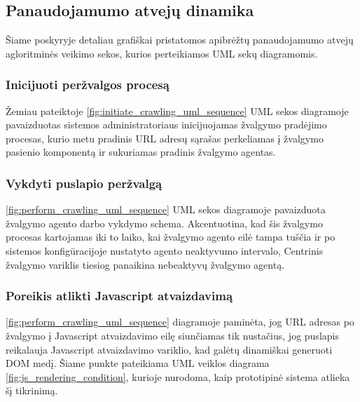 \pagebreak

\subsection{Panaudojamumo atvejų dinamika}

Šiame poskyryje detaliau grafiškai pristatomos apibrėžtų panaudojamumo atvejų agloritminės veikimo sekos, kurios perteikiamos UML sekų diagramomis. 

\subsubsection{Inicijuoti peržvalgos procesą}

Žemiau pateiktoje \ref{fig:initiate_crawling_uml_sequence} UML sekos diagramoje pavaizduotas sistemos administratoriaus inicijuojamas žvalgymo pradėjimo procesas, kurio metu pradinis URL adresų sąrašas perkeliamas į žvalgymo pasienio komponentą ir sukuriamas pradinis žvalgymo agentas.


\pagebreak

\subsubsection{Vykdyti puslapio peržvalgą}

\ref{fig:perform_crawling_uml_sequence} UML sekos diagramoje pavaizduota žvalgymo agento darbo vykdymo schema. Akcentuotina, kad šis žvalgymo procesas kartojamas iki to laiko, kai žvalgymo agento eilė tampa tuščia ir po sistemos konfigūracijoje nustatyto agento neaktyvumo intervalo, Centrinis žvalgymo variklis tiesiog panaikina nebeaktyvų žvalgymo agentą.



\subsubsection{Poreikis atlikti Javascript atvaizdavimą}

\ref{fig:perform_crawling_uml_sequence} diagramoje paminėta, jog URL adresas po žvalgymo į Javascript atvaizdavimo eilę siunčiamas tik nustačius, jog puslapis reikalauja Javascript atvaizdavimo variklio, kad galėtų dinamiškai generuoti DOM medį. Šiame punkte pateikiama UML veiklos diagrama \ref{fig:js_rendering_condition}, kurioje nurodoma, kaip prototipinė sistema atlieka šį tikrinimą.



